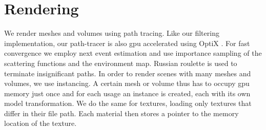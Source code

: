 \section{Rendering}
\label{sec:rendering}
We render meshes and volumes using path tracing.
Like our filtering implementation, our path-tracer is also \ac{gpu} accelerated using OptiX \cite{parker_optix}.
For fast convergence we employ next event estimation and use importance sampling of the scattering functions and the environment map.
Russian roulette is used to terminate insignificant paths.
In order to render scenes with many meshes and volumes, we use instancing.
A certain mesh or volume thus has to occupy \ac{gpu} memory just once and for each usage an instance is created, each with its own model transformation.
We do the same for textures, loading only textures that differ in their file path.
Each material then stores a pointer to the memory location of the texture.

